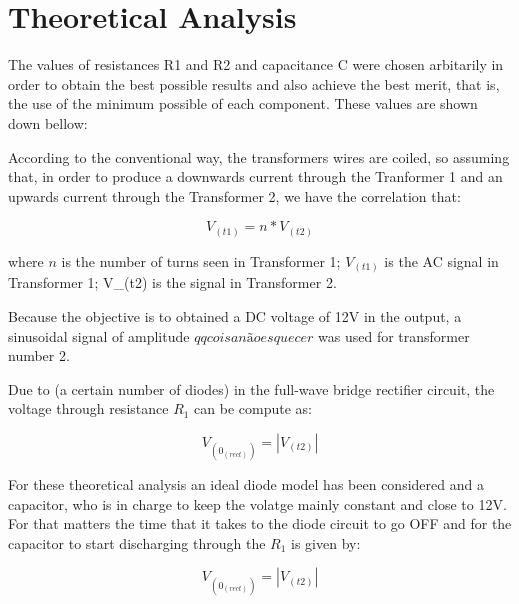 \section{Theoretical Analysis}
\label{sec:analysis}


\par The values of resistances R1 and R2 and capacitance C were chosen arbitarily in order to obtain the best possible results and also achieve the best merit, that is, the use of the minimum possible of each component. These values are shown down bellow: 


\par According to the conventional way, the transformers wires are coiled, so assuming that, in order to produce a downwards current through the Tranformer 1 and an upwards current through the Transformer 2, we have the correlation that:

\begin{equation}
  V_(t1)= n*V_(t2)
  \label{}
\end{equation}    

where $n$ is the number of turns seen in Transformer 1; $V_(t1)$ is the AC signal in Transformer 1; V_(t2) is the signal in Transformer 2.  

\par Because the objective is to obtained a DC voltage of 12V in the output, a sinusoidal signal of amplitude $qq coisa não esquecer$ was used for transformer number 2. 

\par Due to (a certain number of diodes) in the full-wave bridge rectifier circuit, the voltage through resistance $R_1$ can be compute as: 

\begin{equation}
  V_(0_(rect))=|V_(t2)|
  \label{}
\end{equation}    

For these theoretical analysis an ideal diode model has been considered and a capacitor, who is in charge to keep the volatge mainly constant and close to 12V. For that matters the time that it takes to the diode circuit to go OFF and for the capacitor to start discharging through the $R_1$ is given by: 

\begin{equation}
  V_(0_(rect))=|V_(t2)|
  \label{}
\end{equation}    
